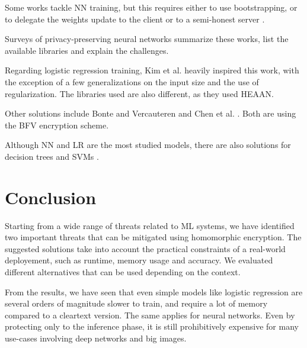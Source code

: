 \documentclass[a4paper,11pt,oneside]{report}
\begin{document}
Some works tackle NN training, but this requires either to use bootstrapping, or to delegate the weights update to the client \cite{mihara_neural_2020} or to a semi-honest server \cite{bellafqira_secure_2018}.

Surveys \cite{pulido-gaytan_privacy-preserving_2021,podschwadt_sok_2022} of privacy-preserving neural networks summarize these works, list the available libraries and explain the challenges.

Regarding logistic regression training, Kim et al. \cite{kim_logistic_2018} heavily inspired this work, with the exception of a few generalizations on the input size and the use of regularization.
The libraries used are also different, as they used HEAAN.

Other solutions include Bonte and Vercauteren \cite{bonte_privacy-preserving_2018} and Chen et al. \cite{chen_logistic_2018}.
Both are using the BFV encryption scheme.

Although NN and LR are the most studied models, there are also solutions for decision trees \cite{akavia_privacy-preserving_2019} and SVMs \cite{park_he-friendly_2020}.


\chapter{Conclusion}



Starting from a wide range of threats related to ML systems, we have identified two important threats that can be mitigated using homomorphic encryption.
The suggested solutions take into account the practical constraints of a real-world deployement, such as runtime, memory usage and accuracy.
We evaluated different alternatives that can be used depending on the context.

From the results, we have seen that even simple models like logistic regression are several orders of magnitude slower to train, and require a lot of memory compared to a cleartext version. 
The same applies for neural networks. 
Even by protecting only to the inference phase, it is still prohibitively expensive for many use-cases involving deep networks and big images.
\end{document}
